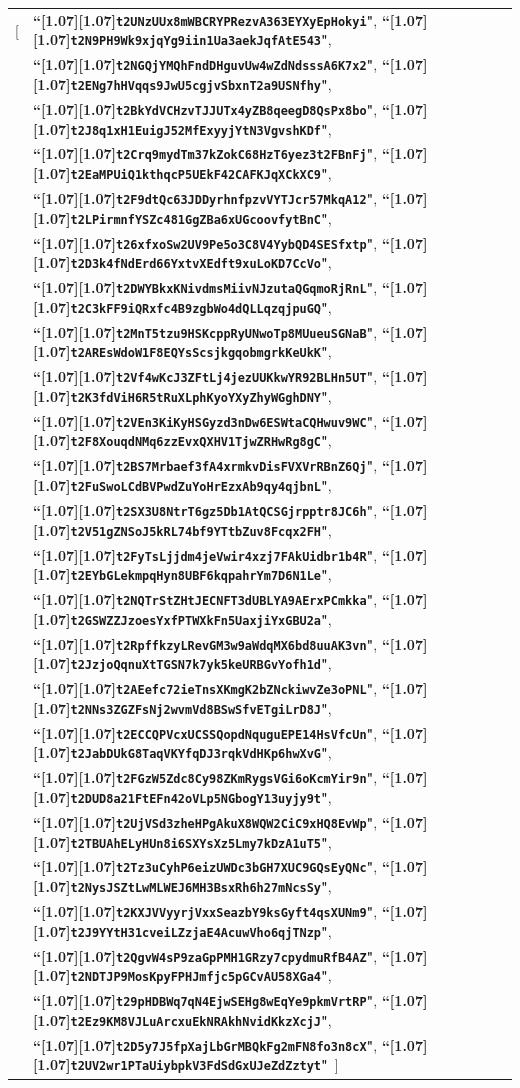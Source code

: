 \documentclass{article}
\let\oldtexttt\texttt
\renewcommand{\texttt}[1]{\scalebox{1.02}[1.07]{\oldtexttt{#1}}}
\numberwithin{theorem}{subsection}
\newcommand{\ascii}[1]{\textbf{``\texttt{#1}"}}
\begin{document}
\begin{tabular}{@{\hskip 2.5em}l@{\;}l}
[& \ascii{t2UNzUUx8mWBCRYPRezvA363EYXyEpHokyi}, \ascii{t2N9PH9Wk9xjqYg9iin1Ua3aekJqfAtE543}, \\
 & \ascii{t2NGQjYMQhFndDHguvUw4wZdNdsssA6K7x2}, \ascii{t2ENg7hHVqqs9JwU5cgjvSbxnT2a9USNfhy}, \\
 & \ascii{t2BkYdVCHzvTJJUTx4yZB8qeegD8QsPx8bo}, \ascii{t2J8q1xH1EuigJ52MfExyyjYtN3VgvshKDf}, \\
 & \ascii{t2Crq9mydTm37kZokC68HzT6yez3t2FBnFj}, \ascii{t2EaMPUiQ1kthqcP5UEkF42CAFKJqXCkXC9}, \\
 & \ascii{t2F9dtQc63JDDyrhnfpzvVYTJcr57MkqA12}, \ascii{t2LPirmnfYSZc481GgZBa6xUGcoovfytBnC}, \\
 & \ascii{t26xfxoSw2UV9Pe5o3C8V4YybQD4SESfxtp}, \ascii{t2D3k4fNdErd66YxtvXEdft9xuLoKD7CcVo}, \\
 & \ascii{t2DWYBkxKNivdmsMiivNJzutaQGqmoRjRnL}, \ascii{t2C3kFF9iQRxfc4B9zgbWo4dQLLqzqjpuGQ}, \\
 & \ascii{t2MnT5tzu9HSKcppRyUNwoTp8MUueuSGNaB}, \ascii{t2AREsWdoW1F8EQYsScsjkgqobmgrkKeUkK}, \\
 & \ascii{t2Vf4wKcJ3ZFtLj4jezUUKkwYR92BLHn5UT}, \ascii{t2K3fdViH6R5tRuXLphKyoYXyZhyWGghDNY}, \\
 & \ascii{t2VEn3KiKyHSGyzd3nDw6ESWtaCQHwuv9WC}, \ascii{t2F8XouqdNMq6zzEvxQXHV1TjwZRHwRg8gC}, \\
 & \ascii{t2BS7Mrbaef3fA4xrmkvDisFVXVrRBnZ6Qj}, \ascii{t2FuSwoLCdBVPwdZuYoHrEzxAb9qy4qjbnL}, \\
 & \ascii{t2SX3U8NtrT6gz5Db1AtQCSGjrpptr8JC6h}, \ascii{t2V51gZNSoJ5kRL74bf9YTtbZuv8Fcqx2FH}, \\
 & \ascii{t2FyTsLjjdm4jeVwir4xzj7FAkUidbr1b4R}, \ascii{t2EYbGLekmpqHyn8UBF6kqpahrYm7D6N1Le}, \\
 & \ascii{t2NQTrStZHtJECNFT3dUBLYA9AErxPCmkka}, \ascii{t2GSWZZJzoesYxfPTWXkFn5UaxjiYxGBU2a}, \\
 & \ascii{t2RpffkzyLRevGM3w9aWdqMX6bd8uuAK3vn}, \ascii{t2JzjoQqnuXtTGSN7k7yk5keURBGvYofh1d}, \\
 & \ascii{t2AEefc72ieTnsXKmgK2bZNckiwvZe3oPNL}, \ascii{t2NNs3ZGZFsNj2wvmVd8BSwSfvETgiLrD8J}, \\
 & \ascii{t2ECCQPVcxUCSSQopdNquguEPE14HsVfcUn}, \ascii{t2JabDUkG8TaqVKYfqDJ3rqkVdHKp6hwXvG}, \\
 & \ascii{t2FGzW5Zdc8Cy98ZKmRygsVGi6oKcmYir9n}, \ascii{t2DUD8a21FtEFn42oVLp5NGbogY13uyjy9t}, \\
 & \ascii{t2UjVSd3zheHPgAkuX8WQW2CiC9xHQ8EvWp}, \ascii{t2TBUAhELyHUn8i6SXYsXz5Lmy7kDzA1uT5}, \\
 & \ascii{t2Tz3uCyhP6eizUWDc3bGH7XUC9GQsEyQNc}, \ascii{t2NysJSZtLwMLWEJ6MH3BsxRh6h27mNcsSy}, \\
 & \ascii{t2KXJVVyyrjVxxSeazbY9ksGyft4qsXUNm9}, \ascii{t2J9YYtH31cveiLZzjaE4AcuwVho6qjTNzp}, \\
 & \ascii{t2QgvW4sP9zaGpPMH1GRzy7cpydmuRfB4AZ}, \ascii{t2NDTJP9MosKpyFPHJmfjc5pGCvAU58XGa4}, \\
 & \ascii{t29pHDBWq7qN4EjwSEHg8wEqYe9pkmVrtRP}, \ascii{t2Ez9KM8VJLuArcxuEkNRAkhNvidKkzXcjJ}, \\
 & \ascii{t2D5y7J5fpXajLbGrMBQkFg2mFN8fo3n8cX}, \ascii{t2UV2wr1PTaUiybpkV3FdSdGxUJeZdZztyt}\, ]
\end{tabular}
\end{document}
